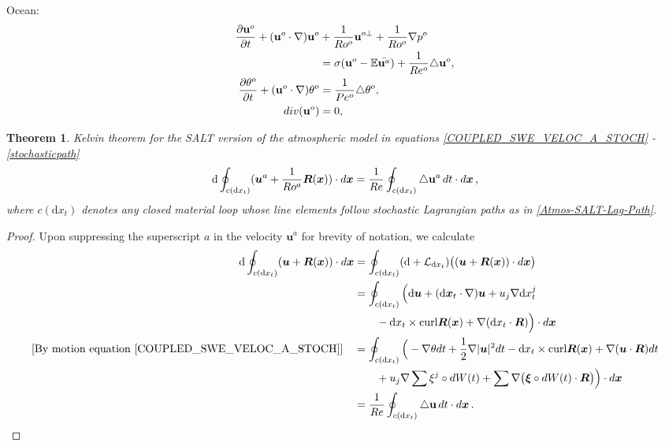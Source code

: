 \documentclass[11pt, oneside]{article}   	%
\numberwithin{equation}{section}
\theoremstyle{plain}
\newtheorem{theorem}{Theorem}[section]
\theoremstyle{definition}
\theoremstyle{remark}
\newcommand{\<}{\langle}
\renewcommand{\>}{\rangle}
\def\U{{\bf u}}
\def\rmd{{\mathrm{d}}}
\newcommand{\bs}[1]{\boldsymbol{#1}}
\begin{document}
\noindent Ocean: %
\begin{align}
\frac{\partial \mathbf{u}^{o}}{\partial t}+(\mathbf{u}^{o}\cdot \nabla )%
\mathbf{u}^{o}&+\frac{1}{Ro^{o}}\mathbf{u}^{o\bot }+\frac{1}{Ro^{o}}\nabla
p^{o}  \notag \\
& =\sigma (\mathbf{u}^{o}-\mathbb{E}\bar{\mathbf{u}^{a}})+\frac{1}{Re^{o}}%
\triangle \mathbf{u}^{o},  \label{COUPLED_SWE_VELOC_O_STOCH} \\
\frac{\partial \theta ^{o}}{\partial t}+(\mathbf{u}^{o}\cdot \nabla
)\theta ^{o}&=\frac{1}{Pe^{o}}\triangle \theta ^{o},
\label{COUPLED_SWE_T_O_STOCH} \\
{\ div}(\mathbf{u}^{o})&=0,  \label{COUPLED_SWE_INCOMPRESS_O_STOCH}
\end{align}%

\begin{theorem}Kelvin theorem for the SALT version of the atmospheric model in equations \eqref{COUPLED_SWE_VELOC_A_STOCH} - \eqref{stochasticpath}
\begin{align}
{\rm d}\oint_{c({\rmd x_t})} (\bs{u}^a + \frac{1}{Ro^a}\bs{R}(\bs{x}))\cdot d\bs{x}
=  \frac{1}{Re}\oint_{c({\rmd x_t})} \triangle\U^a \,dt \cdot d\bs{x}
\,,\label{Atmos-SALT-Kel}
\end{align}
where $c({\rmd x_t})$ denotes any closed material loop whose line elements follow stochastic  Lagrangian paths 
as in \eqref{Atmos-SALT-Lag-Path}.
\end{theorem}
\begin{proof}
Upon suppressing the superscript $a$ in the velocity $\bs{u}^a$ for brevity of notation, we calculate
\begin{align*}
{\rm d}\oint_{c({\rmd x_t})} (\bs{u}+ \bs{R}(\bs{x}))\cdot d\bs{x}
&=
\oint_{c({\rmd x_t})} ({\rm d} + \mathcal{L}_{{\rmd x_t}}) \big((\bs{u} + \bs{R}(\bs{x}))\cdot d\bs{x}\big)
\\&= \oint_{c({\rmd x_t})} \Big( 
{\rm d} \bs{u} + (\rmd\bs{x}_t\cdot\nabla)\bs{u} + u_j \nabla {\rm d}x_t^j
\\& \qquad - {\rmd x_t}\times {\rm curl}\bs{R}(\bs{x}) 
+ \nabla ({\rmd x_t}\cdot\bs{R})
\Big)\cdot d\bs{x} 
\\\hbox{[By motion equation \eqref{COUPLED_SWE_VELOC_A_STOCH}]}\quad& =  \oint_{c({\rmd x_t})}\Big(- \nabla\theta dt
+ \frac12\nabla |\bs{u}|^2dt - {\rmd x_t}\times {\rm curl}\bs{R}(\bs{x})  + \nabla (\bs{u}\cdot\bs{R})dt
\\& \qquad  + { u_j  \nabla \sum \xi^j\circ dW(t)
+ \sum\nabla \big(\bs{\xi}\circ dW(t)\cdot\bs{R}\big)}
\Big)\cdot d\bs{x}
\\&=
\frac{1}{Re}\oint_{c({\rmd x_t})} \triangle\U\,dt \cdot d\bs{x}
\,.
\end{align*}

\end{proof}
\end{document}
